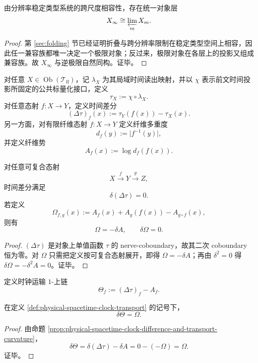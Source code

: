\begin{proposition}[统一对象层]\label{prop:physical-spacetime-unified-object-layer}
由分辨率稳定类型系统的跨尺度相容性，存在统一对象层
\[
X_\infty\cong \varprojlim_m X_m.
\]
\end{proposition}
\begin{proof}
第 \ref{sec:folding} 节已经证明折叠与跨分辨率限制在稳定类型空间上相容，因此任一兼容族都唯一决定一个极限对象；反过来，极限对象在各层上的投影又组成兼容族。故 \(X_\infty\) 与逆极限自然同构。证毕。
\end{proof}

\begin{definition}[时间读出与纤维势]\label{def:physical-spacetime-clock-readout-fiber-potential}
对任意 \(X\in\operatorname{Ob}(\mathcal T_{\mathrm{ff}})\)，记 \(\lambda_X\) 为其局域时间读出映射，并以 \(\chi\) 表示前文时间投影所固定的公共标量化接口，定义
\[
\tau_X:=\chi\circ\lambda_X.
\]
对任意态射 \(f:X\to Y\)，定义时间差分
\[
(\Delta\tau)_f(x):=\tau_Y(f(x))-\tau_X(x).
\]
另一方面，对有限纤维态射 \(f:X\to Y\) 定义纤维多重度
\[
d_f(y):=\lvert f^{-1}(y)\rvert,
\]
并定义纤维势
\[
A_f(x):=\log d_f(f(x)).
\]
\end{definition}

\begin{proposition}[时间差分闭性与运输曲率]\label{prop:physical-spacetime-clock-difference-and-transport-curvature}
对任意可复合态射
\[
X\xrightarrow{f}Y\xrightarrow{g}Z,
\]
时间差分满足
\[
\delta(\Delta\tau)=0.
\]
若定义
\[
\Omega_{f,g}(x):=A_f(x)+A_g(f(x))-A_{g\circ f}(x),
\]
则有
\[
\Omega=-\delta A,\qquad \delta\Omega=0.
\]
\end{proposition}
\begin{proof}
\((\Delta\tau)\) 是对象上单值函数 \(\tau\) 的 nerve-coboundary，故其二次 coboundary 恒为零。对 \(\Omega\) 只需把定义按可复合态射展开，即得 \(\Omega=-\delta A\)；再由 \(\delta^2=0\) 得 \(\delta\Omega=-\delta^2A=0\)。证毕。
\end{proof}

\begin{definition}[时钟运输 \(1\)-上链]\label{def:physical-spacetime-clock-transport}
定义时钟运输 \(1\)-上链
\[
\Theta_f:=(\Delta\tau)_f-A_f.
\]
\end{definition}

\begin{theorem}[时钟运输方程]\label{thm:physical-spacetime-clock-transport-equation}
在定义 \ref{def:physical-spacetime-clock-transport} 的记号下，
\[
\delta\Theta=\Omega.
\]
\end{theorem}
\begin{proof}
由命题 \ref{prop:physical-spacetime-clock-difference-and-transport-curvature}，
\[
\delta\Theta=\delta(\Delta\tau)-\delta A=0-(-\Omega)=\Omega.
\]
证毕。
\end{proof}

